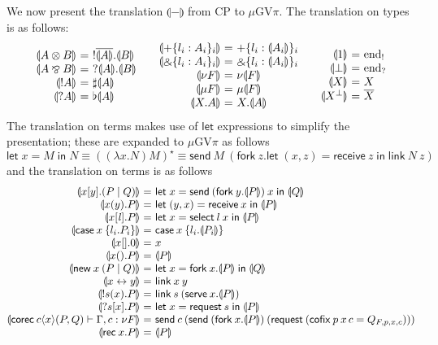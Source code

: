 \documentclass[orivec,envcountsame]{llncs}
\makeatletter
\newcommand{\with}{\mathbin\binampersand}
\newcommand{\parr}{\mathbin\bindnasrepma}
\newcommand{\cpdual}[1]{#1^\perp}
\newcommand{\cpbang}[1]{{! #1}}
\newcommand{\cpquery}[1]{{? #1}}
\newcommand{\gvdual}[1]{\overline{#1}}
\newcommand{\gvout}[2]{{!#1.#2}}
\newcommand{\gvin}[2]{{?#1.#2}}
\newcommand{\outterm}{\mathrm{end}_!}
\newcommand{\interm}{\mathrm{end}_?}
\newcommand{\gvserver}[1]{\flat #1}
\newcommand{\gvservice}[1]{\sharp #1}
\newcommand{\cptyp}[2]{#1 \vdash #2}
\newcommand{\mkwd}[1]{\mathsf{#1}}
\newcommand{\link}[2]{#1 \leftrightarrow #2}
\newcommand{\cut}[4]{\mkwd{new}\:#1 \: (#3 \mid #4)}
\newcommand{\replicate}[2]{{!#1(#2)}}
\newcommand{\derelict}[2]{{?#1[#2]}}
\newcommand{\rec}[1]{\mkwd{rec}\:#1}
\newcommand{\corec}[5]{\mkwd{corec}\:#1 \langle #2 \rangle (#4,#5)}
\newcommand{\clabel}[1]{\mathrm{#1}}
\renewcommand{\case}[2]{\mkwd{case}\:#1\:\{#2\}}
\newcommand{\sel}[2]{#1[\clabel{#2}]}
\newcommand{\gvsend}[2]{\mkwd{send}\:#1\:#2}
\newcommand{\gvreceive}[1]{\mkwd{receive}\:#1}
\newcommand{\gvlet}[3]{\mkwd{let}\;#1 = #2\;\mkwd{in}\;#3}
\newcommand{\gvselect}[2]{\mkwd{select}\:#1\:#2}
\newcommand{\gvcase}[2]{\mkwd{case}\:#1\:\{#2\}}
\newcommand{\gvlink}[2]{\mkwd{link}\:#1\:#2}
\newcommand{\gvfork}[2]{\mkwd{fork}\:#1.#2}
\newcommand{\lrkwd}{\mkwd{cofix}}
\newcommand{\gvfix}[3]{\lrkwd\:#1\:#2 = #3}
\newcommand{\gvserve}[2]{\mkwd{serve}\:#1.#2}
\newcommand{\gvrequest}[1]{\mkwd{request}\:#1}
\newcommand{\gvreceivek}[4]{\gvlet{({#1}, {#2})}{\gvreceive{#3}}{#4}}
\newcommand{\key}{\mkwd}
\newcommand{\togv}[1]{\llparenthesis #1 \rrparenthesis}
\newcommand{\topi}[1]{({#1})^\star}
\newcommand{\gvpi}{$\mu\mathrm{GV}\pi$\xspace}
\newcommand{\ba}{\begin{array}}
\newcommand{\ea}{\end{array}}
\newenvironment{equations}{\[\ba{@{}r@{~}c@{~}l@{}}}{\ea\]}
\newenvironment{eqs}{\ba{@{}r@{~}c@{~}l@{}}}{\ea}
\makeatother
\begin{document}
We now present the translation $\togv{-}$ from CP to \gvpi. The translation on types is as follows:
\[
\ba{@{}c@{\qquad}c@{\qquad}c@{}}
\begin{eqs}
\togv{A \otimes B} &=& \gvout{\gvdual{\togv{A}}}{\togv{B}} \\
\togv{A \parr B}   &=& \gvin{\togv{A}}{\togv{B}} \\
\togv{\cpbang{A}}   &=& \gvservice{\togv{A}} \\
\togv{\cpquery{A}}  &=& \gvserver{\togv{A}} \\
\end{eqs}
&
\begin{eqs}
\togv{+\{l_i:A_i\}_i}     &=& +\{l_i:\togv{A_i}\}_i  \\
\togv{\with\{l_i:A_i\}_i} &=& \with\{l_i:\togv{A_i}\}_i \\
\togv{\nu F} &=& \nu \togv{F} \\
\togv{\mu F} &=& \mu \togv{F} \\
\togv{X.A} &=& X.\togv{A} \\
\end{eqs}
&
\begin{eqs}
\togv{1}           &=& \outterm \\
\togv{\bot}              &=& \interm \\
\togv{X}            &=& X \\
\togv{\cpdual{X}}   &=& \gvdual{X} \\
\end{eqs}
\ea
\]
The translation on terms makes use of $\key{let}$ expressions to simplify the presentation; these
are expanded to \gvpi as follows
\[
\gvlet{x}{M}{N} \equiv
  \topi{(\lambda x.N) M} \equiv
  \gvsend{M}{(\gvfork{z}{\gvreceivek{x}{z}{z}{\gvlink{N}{z}}})}
\]%
and the translation on terms is as follows
\begin{equations}
  \togv{x[y].(P \mid Q)} &=&
    \gvlet{x}{\gvsend{(\gvfork{y}{\togv{P}})}{x}}{\togv{Q}} \\
  \togv{x(y).P} &=&
    \gvlet{(y,x)}{\gvreceive{x}}{\togv{P}} \\
  \togv{\sel{x}{\mathit{l}}.P} &=&
    \gvlet{x}{\gvselect{l}{x}}{\togv{P}} \\
  \togv{\case{x}{l_i.P_i}} &=&
    \gvcase{x}{l_i.\togv{P_i}} \\
  \togv{x[].0} &=& x \\
  \togv{x().P} &=& \togv{P} \\
  \togv{\cut{x}{}{P}{Q}} &=&
    \gvlet{x}{\gvfork{x}{\togv{P}}}{\togv{Q}} \\
  \togv{\link{x}{y}} &=& \gvlink{x}{y} \\
  \togv{\replicate{s}{x}.P} &=&
    \gvlink{s}{(\gvserve{x}{\togv{P}})} \\
  \togv{\derelict{s}{x}.P} &=&
    \gvlet{x}{\gvrequest{s}}{\togv{P}} \\
  \togv{\cptyp{\corec{c}{x}{}{P}{Q}}{\Gamma, c:\nu F}} &=&
    \gvsend{c}{(\gvsend{(\gvfork{x}{\togv{P}})}{(\gvrequest{(\gvfix{p}{x\,c}{Q_{F,p,x,c}})})})} \\
  \togv{\rec{x}.P} &=& \togv{P} \\
\end{equations}%
\end{document}
